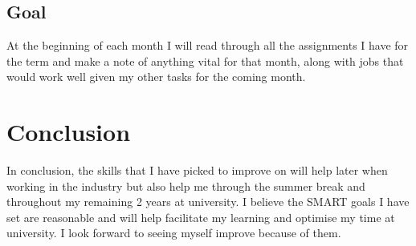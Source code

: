 \documentclass{scrartcl}
\begin{document}
\subsection{Goal}
At the beginning of each month I will read through all the assignments I have for the term and make a note of anything vital for that month, along with jobs that would work well given my other tasks for the coming month.

\section{Conclusion}
In conclusion, the skills that I have picked to improve on will help later when working in the industry but also help me through the summer break and throughout my remaining 2 years at university. I believe the SMART goals I have set are reasonable and will help facilitate my learning and optimise my time at university. I look forward to seeing myself improve because of them.
\end{document}
